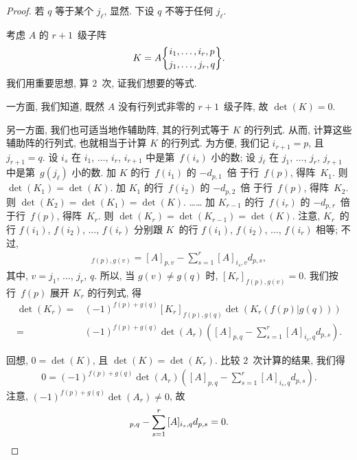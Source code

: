 \documentclass[../libro.tex]{subfiles}
\begin{document}
\begin{proof}
    若 \(q\) 等于某个 \(j_\ell\), 显然.
    下设 \(q\) 不等于任何 \(j_\ell\).

    考虑 \(A\) 的 \(r+1\)~级子阵
    \begin{align*}
        K =
        A\submat{i_1,\dots,i_r,p}{j_1,\dots,j_r,q}.
    \end{align*}
    我们用重要思想, 算 \(2\)~次,
    证我们想要的等式.

    一方面, 我们知道, 既然
    \(A\) 没有行列式非零的 \(r+1\)~级子阵,
    故 \(\det {(K)} = 0\).

    另一方面, 我们也可适当地作辅助阵,
    其的行列式等于 \(K\) 的行列式.
    从而, 计算这些辅助阵的行列式,
    也就相当于计算 \(K\) 的行列式.
    为方便, 我们记
    \(i_{r+1} = p\),
    且 \(j_{r+1} = q\).
    设 \(i_s\) 在
    \(i_1\), \(\dots\), \(i_r\), \(i_{r+1}\)
    中是第~\(f(i_s)\) 小的数;
    设 \(j_\ell\) 在
    \(j_1\), \(\dots\), \(j_r\), \(j_{r+1}\)
    中是第~\(g(j_\ell)\) 小的数.
    加 \(K\) 的行~\(f(i_1)\) 的 \(-d_{p,1}\)~倍%
    于行~\(f(p)\),
    得阵~\(K_1\).
    则 \(\det {(K_1)} = \det {(K)}\).
    加 \(K_1\) 的行~\(f(i_2)\) 的 \(-d_{p,2}\)~倍%
    于行~\(f(p)\),
    得阵~\(K_2\).
    则 \(\det {(K_2)} = \det {(K_1)} = \det {(K)}\).
    ……
    加 \(K_{r-1}\) 的行~\(f(i_r)\) 的 \(-d_{p,r}\)~倍%
    于行~\(f(p)\),
    得阵~\(K_r\).
    则 \(\det {(K_r)} = \det {(K_{r-1})} = \det {(K)}\).
    注意, \(K_r\)~的行
    \(f(i_1)\), \(f(i_2)\), \(\dots\), \(f(i_r)\)
    分别跟 \(K\)~的行
    \(f(i_1)\), \(f(i_2)\), \(\dots\), \(f(i_r)\)
    相等;
    不过,
    \begin{align*}
        [K_r]_{f(p),g(v)}
        = [A]_{p,v} -
        \sum_{s = 1}^{r}
        {[A]_{i_s,v} d_{p,s}},
    \end{align*}
    其中, \(v = j_1\), \(\dots\), \(j_r\), \(q\).
    所以, 当
    \(g(v) \neq g(q)\)
    时,
    \([K_r]_{f(p),g(v)} = 0\).
    我们按行~\(f(p)\) 展开 \(K_r\) 的行列式,
    得
    \begin{align*}
        \det {(K_r)}
        = {} &
        (-1)^{f(p)+g(q)} [K_r]_{f(p),g(q)}
        \det {(K_r (f(p)|g(q)))}
        \\
        = {} &
        (-1)^{f(p)+g(q)} \det {(A_r)}
        \left(
            [A]_{p,q} -
            \sum_{s = 1}^{r}
            {[A]_{i_s,q} d_{p,s}}
        \right).
    \end{align*}

    回想, \(0 = \det {(K)}\),
    且 \(\det {(K)} = \det {(K_r)}\).
    比较 \(2\)~次计算的结果, 我们得
    \begin{align*}
        0 =
        (-1)^{f(p)+g(q)} \det {(A_r)}
        \left(
            [A]_{p,q} -
            \sum_{s = 1}^{r}
            {[A]_{i_s,q} d_{p,s}}
        \right).
    \end{align*}
    注意,
    \((-1)^{f(p)+g(q)} \det {(A_r)} \neq 0\),
    故
    \begin{equation*}
        [A]_{p,q} -
        \sum_{s = 1}^{r}
        {[A]_{i_s,q} d_{p,s}} = 0.
        \qedhere
    \end{equation*}
\end{proof}
\end{document}

